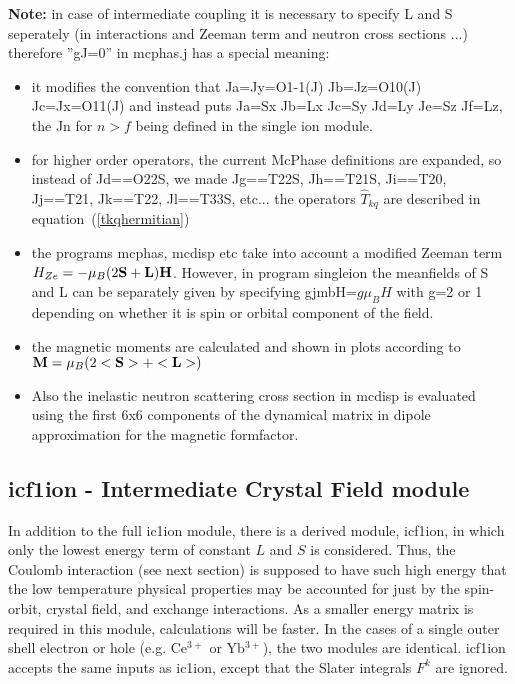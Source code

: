 {\bf Note:} in case of intermediate coupling
it is necessary to specify
L and S seperately (in interactions and Zeeman term and neutron cross sections ...)
therefore  ''gJ=0'' in {\prg mcphas.j} has a special meaning:
\begin{itemize}
\item  it modifies
the convention that Ja=Jy=O1-1(J) Jb=Jz=O10(J) Jc=Jx=O11(J) and instead
puts Ja=Sx Jb=Lx Jc=Sy Jd=Ly Je=Sz Jf=Lz, the Jn for $n>f$ being defined in the single
ion module. 
\item for higher order operators, the current McPhase definitions are expanded, so instead of
Jd==O22S, we made Jg==T22S, Jh==T21S, Ji==T20, Jj==T21, Jk==T22,
Jl==T33S, etc... the operators $\hat T_{kq}$ are described in equation~(\ref{tkqhermitian})
\item the programs {\prg mcphas, mcdisp etc} take into account
 a modified Zeeman term $H_{Ze}=-\mu_B(2\mathbf S+\mathbf L)\mathbf H$.
 However, in program {\prg singleion} the meanfields of S and L can be
 separately given by specifying gjmbH=$g \mu_B H$ with g=2 or 1 depending
 on whether it is spin or orbital component of the field. 
\item the magnetic moments are calculated and shown in plots according 
to $\mathbf M=\mu_B(2<\mathbf S>+<\mathbf L>)$
\item Also the inelastic neutron scattering cross section in {\prg mcdisp} is evaluated using the first
6x6 components of the dynamical matrix  in dipole approximation for the magnetic formfactor.
\end{itemize}

\subsection{{\prg icf1ion} - Intermediate Crystal Field module}

In addition to the full {\prg ic1ion} module, there is a derived module, {\prg icf1ion}, in which only the lowest
energy term of constant $L$ and $S$ is considered. Thus, the Coulomb interaction (see next section) is supposed
to have such high energy that the low temperature physical properties may be accounted for just by the spin-orbit,
crystal field, and exchange interactions. As a smaller energy matrix is required in this module, calculations will
be faster. In the cases of a single outer shell electron or hole (e.g. Ce$^{3+}$ or Yb$^{3+}$), the two modules are 
identical. {\prg icf1ion} accepts the same inputs as {\prg ic1ion}, except that the Slater integrals $F^k$ are 
ignored. 

